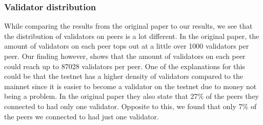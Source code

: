\subsubsection{Validator distribution}\label{subsubsec:validator-distribution}
While comparing the results from the original paper to our results, we see that the distribution of validators on peers is a lot different.
In the original paper, the amount of validators on each peer tops out at a little over 1000 validators per peer.
Our finding however, shows that the amount of validators on each peer could reach up to 87028 validators per peer.
One of the explanations for this could be that the testnet has a higher density of validators compared to the mainnet since it is easier to become a validator on the testnet due to money not being a problem.
In the original paper they also state that 27\% of the peers they connected to had only one validator.
Opposite to this, we found that only 7\% of the peers we connected to had just one validator.
